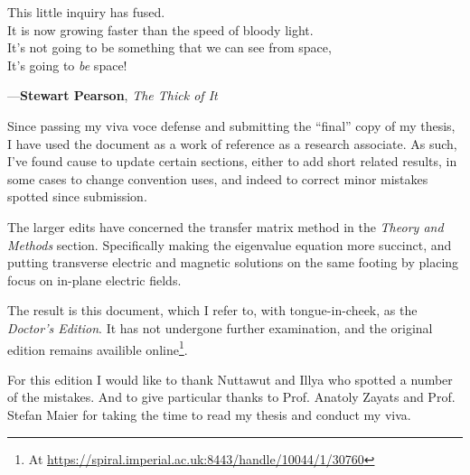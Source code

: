 \begin{displayquote}
This little inquiry has fused.\\
It is now growing faster than the speed of bloody light.\\
It's not going to be something that we can see from space,\\
It's going to \emph{be} space!
\end{displayquote}
—\textbf{Stewart Pearson}, \emph{The Thick of It}


\clearpage

Since passing my viva voce defense and submitting the “final” copy of my thesis,
I have used the document as a work of reference as a research associate.
As such, I've found cause to update certain sections, either to add short
related results, in some cases to change convention uses, and indeed to correct
minor mistakes spotted since submission.

The larger edits have concerned the transfer matrix method in the \emph{Theory
and Methods} section.
Specifically making the eigenvalue equation more succinct, and putting
transverse electric and magnetic solutions on the same footing by
placing focus on in-plane electric fields.

The result is this document, which I refer to, with tongue-in-cheek, as the
\emph{Doctor's Edition}.
It has not undergone further examination, and the original edition remains
availible online\footnote{At
\href{https://spiral.imperial.ac.uk:8443/handle/10044/1/30760}{
https://spiral.imperial.ac.uk:8443/handle/10044/1/30760}}.

For this edition I would like to thank Nuttawut and Illya who spotted a number
of the mistakes.
And to give particular thanks to Prof. Anatoly Zayats and Prof. Stefan Maier for
taking the time to read my thesis and conduct my viva.


\clearpage
{}
\tableofcontents


\clearpage
\listoffigures
\listoftables


